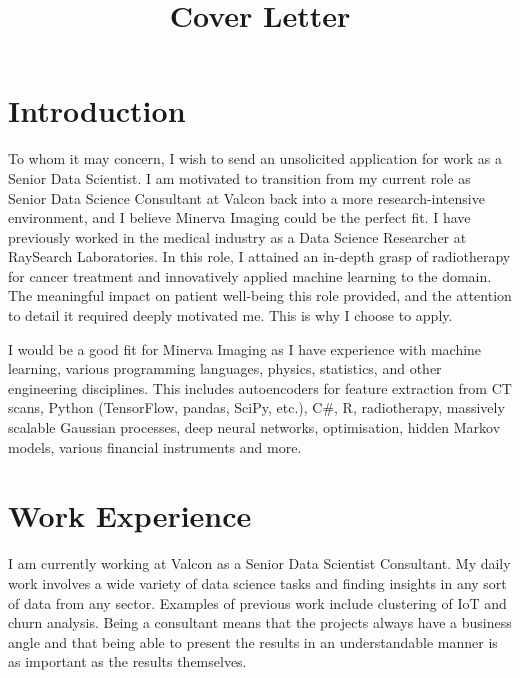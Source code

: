 \documentclass[10pt,a4paper,sans]{moderncv}
\title{Cover Letter}
\newcommand{\company}{Minerva Imaging}
\begin{document}
\makecvtitle
\pagestyle{empty}

\section{Introduction}

To whom it may concern, I wish to send an unsolicited application for work as a Senior Data Scientist. I am motivated to transition from my current role as Senior Data Science Consultant at Valcon back into a more research-intensive environment, and I believe \company{} could be the perfect fit. I have previously worked in the medical industry as a Data Science Researcher at RaySearch Laboratories. In this role, I attained an in-depth grasp of radiotherapy for cancer treatment and innovatively applied machine learning to the domain. The meaningful impact on patient well-being this role provided, and the attention to detail it required deeply motivated me. This is why I choose to apply.

\hspace{7 mm} I would be a good fit for \company{} as I have experience with machine learning, various programming languages, physics, statistics, and other engineering disciplines. This includes autoencoders for feature extraction from CT scans, Python (TensorFlow, pandas, SciPy, etc.), C\#, R, radiotherapy, massively scalable Gaussian processes, deep neural networks, optimisation, hidden Markov models, various financial instruments and more.

\section{Work Experience}
I am currently working at Valcon as a Senior Data Scientist Consultant. My daily work involves a wide variety of data science tasks and finding insights in any sort of data from any sector. Examples of previous work include clustering of IoT and churn analysis. Being a consultant means that the projects always have a business angle and that being able to present the results in an understandable manner is as important as the results themselves.
\end{document}

